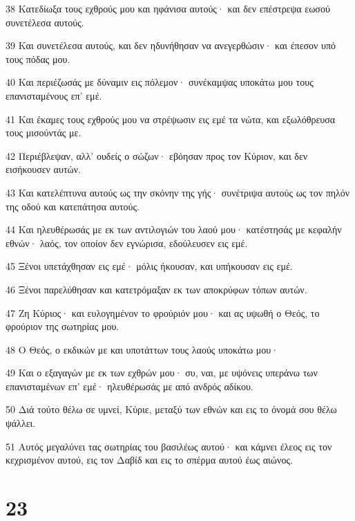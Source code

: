 \par 38 Κατεδίωξα τους εχθρούς μου και ηφάνισα αυτούς· και δεν επέστρεψα εωσού συνετέλεσα αυτούς.
\par 39 Και συνετέλεσα αυτούς, και δεν ηδυνήθησαν να ανεγερθώσιν· και έπεσον υπό τους πόδας μου.
\par 40 Και περιέζωσάς με δύναμιν εις πόλεμον· συνέκαμψας υποκάτω μου τους επανισταμένους επ' εμέ.
\par 41 Και έκαμες τους εχθρούς μου να στρέψωσιν εις εμέ τα νώτα, και εξωλόθρευσα τους μισούντάς με.
\par 42 Περιέβλεψαν, αλλ' ουδείς ο σώζων· εβόησαν προς τον Κύριον, και δεν εισήκουσεν αυτών.
\par 43 Και κατελέπτυνα αυτούς ως την σκόνην της γής· συνέτριψα αυτούς ως τον πηλόν της οδού και κατεπάτησα αυτούς.
\par 44 Και ηλευθέρωσάς με εκ των αντιλογιών του λαού μου· κατέστησάς με κεφαλήν εθνών· λαός, τον οποίον δεν εγνώρισα, εδούλευσεν εις εμέ.
\par 45 Ξένοι υπετάχθησαν εις εμέ· μόλις ήκουσαν, και υπήκουσαν εις εμέ.
\par 46 Ξένοι παρελύθησαν και κατετρόμαξαν εκ των αποκρύφων τόπων αυτών.
\par 47 Ζη Κύριος· και ευλογημένον το φρούριόν μου· και ας υψωθή ο Θεός, το φρούριον της σωτηρίας μου.
\par 48 Ο Θεός, ο εκδικών με και υποτάττων τους λαούς υποκάτω μου·
\par 49 Και ο εξαγαγών με εκ των εχθρών μου· συ, ναι, με υψόνεις υπεράνω των επανισταμένων επ' εμέ· ηλευθέρωσάς με από ανδρός αδίκου.
\par 50 Διά τούτο θέλω σε υμνεί, Κύριε, μεταξύ των εθνών και εις το όνομά σου θέλω ψάλλει.
\par 51 Αυτός μεγαλύνει τας σωτηρίας του βασιλέως αυτού· και κάμνει έλεος εις τον κεχρισμένον αυτού, εις τον Δαβίδ και εις το σπέρμα αυτού έως αιώνος.

\chapter{23}

